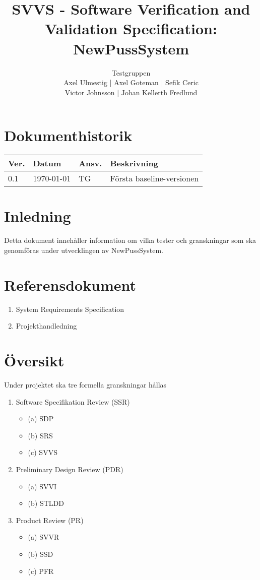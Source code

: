 \documentclass[a4paper]{article}
\title{SVVS - Software Verification and Validation Specification: NewPussSystem}
\author{Testgruppen \\ Axel Ulmestig | Axel Goteman | Sefik Ceric \\ Victor Johnsson | Johan Kellerth Fredlund}
\date{}
\begin{document}
\maketitle
\thispagestyle{fancy}
\tableofcontents
\newpage

\section*{Dokumenthistorik}

\begin{tabular}{ l l l l }
Ver. & Datum & Ansv. & Beskrivning \\\hline
0.1 & \today & TG & Första baseline-versionen

\end{tabular}
\section{Inledning}       

Detta dokument innehåller information om vilka tester och granskningar som ska genomföras under utvecklingen av NewPussSystem.

\section{Referensdokument}
\begin{enumerate}
\item System Requirements Specification
\item Projekthandledning
\end{enumerate}

\section{Översikt}

Under projektet ska tre formella granskningar hållas

\begin{enumerate}


\item Software Specifikation Review (SSR)
\begin{itemize}
\item [](a) SDP
\item [](b) SRS
\item [](c) SVVS
\end{itemize}


\item Preliminary Design Review (PDR)
\begin{itemize}
\item [](a) SVVI
\item [](b) STLDD
\end{itemize}


\item Product Review (PR)
\begin{itemize}
\item [](a) SVVR
\item [](b) SSD
\item [](c) PFR
\end{itemize}


\end{enumerate}
\end{document}
